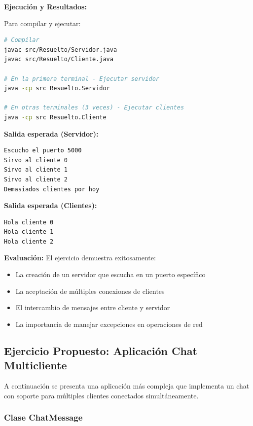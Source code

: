 \documentclass{article}
\begin{document}
\textbf{Ejecución y Resultados:}

Para compilar y ejecutar:
\begin{lstlisting}[language=bash, numbers=none, caption={Comandos de compilación y ejecución}]
# Compilar
javac src/Resuelto/Servidor.java
javac src/Resuelto/Cliente.java

# En la primera terminal - Ejecutar servidor
java -cp src Resuelto.Servidor

# En otras terminales (3 veces) - Ejecutar clientes
java -cp src Resuelto.Cliente
\end{lstlisting}

\textbf{Salida esperada (Servidor):}
\begin{verbatim}
Escucho el puerto 5000
Sirvo al cliente 0
Sirvo al cliente 1
Sirvo al cliente 2
Demasiados clientes por hoy
\end{verbatim}

\textbf{Salida esperada (Clientes):}
\begin{verbatim}
Hola cliente 0
Hola cliente 1
Hola cliente 2
\end{verbatim}

\textbf{Evaluación:}
El ejercicio demuestra exitosamente:
\begin{itemize}
    \item La creación de un servidor que escucha en un puerto específico
    \item La aceptación de múltiples conexiones de clientes
    \item El intercambio de mensajes entre cliente y servidor
    \item La importancia de manejar excepciones en operaciones de red
\end{itemize}

\subsection{Ejercicio Propuesto: Aplicación Chat Multicliente}

A continuación se presenta una aplicación más compleja que implementa un chat con soporte para múltiples clientes conectados simultáneamente.

\subsubsection{Clase ChatMessage}


\end{document}
